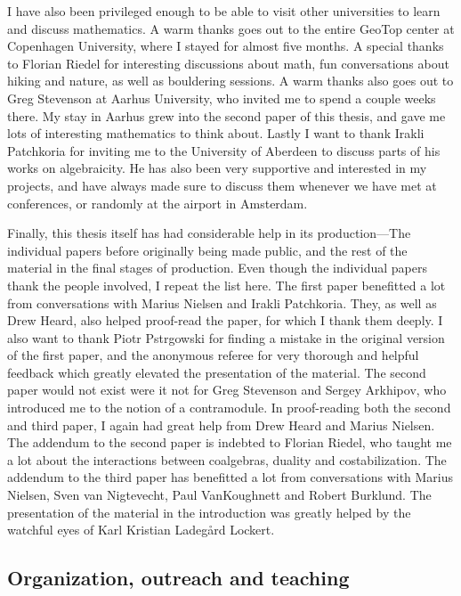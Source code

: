 I have also been privileged enough to be able to visit other universities to learn and discuss mathematics. A warm thanks goes out to the entire GeoTop center at Copenhagen University, where I stayed for almost five months. A special thanks to Florian Riedel for interesting discussions about math, fun conversations about hiking and nature, as well as bouldering sessions. A warm thanks also goes out to Greg Stevenson at Aarhus University, who invited me to spend a couple weeks there. My stay in Aarhus grew into the second paper of this thesis, and gave me lots of interesting mathematics to think about. Lastly I want to thank Irakli Patchkoria for inviting me to the University of Aberdeen to discuss parts of his works on algebraicity. He has also been very supportive and interested in my projects, and have always made sure to discuss them whenever we have met at conferences, or randomly at the airport in Amsterdam. 

Finally, this thesis itself has had considerable help in its production---The individual papers before originally being made public, and the rest of the material in the final stages of production. Even though the individual papers thank the people involved, I repeat the list here. The first paper benefitted a lot from conversations with Marius Nielsen and Irakli Patchkoria. They, as well as Drew Heard, also helped proof-read the paper, for which I thank them deeply. I also want to thank Piotr Pstr\a{}gowski for finding a mistake in the original version of the first paper, and the anonymous referee for very thorough and helpful feedback which greatly elevated the presentation of the material. The second paper would not exist were it not for Greg Stevenson and Sergey Arkhipov, who introduced me to the notion of a contramodule. In proof-reading both the second and third paper, I again had great help from Drew Heard and Marius Nielsen. The addendum to the second paper is indebted to Florian Riedel, who taught me a lot about the interactions between coalgebras, duality and costabilization. The addendum to the third paper has benefitted a lot from conversations with Marius Nielsen, Sven van Nigtevecht, Paul VanKoughnett and Robert Burklund. The presentation of the material in the introduction was greatly helped by the watchful eyes of Karl Kristian Ladegård Lockert. 


\subsection*{Organization, outreach and teaching}

